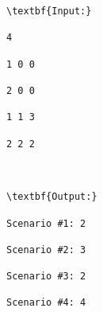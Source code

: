 \begin{verbatim}
\textbf{Input:}

4

1 0 0

2 0 0

1 1 3

2 2 2



\textbf{Output:}

Scenario #1: 2

Scenario #2: 3

Scenario #3: 2

Scenario #4: 4

\end{verbatim}